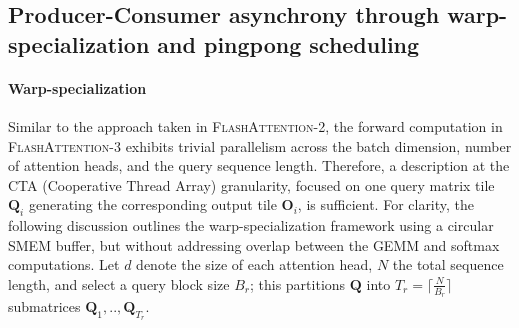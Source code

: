 \begin{enumerate}
\subsection{Producer-Consumer asynchrony through warp-specialization and pingpong scheduling}
\label{sec:algo_ws}

\paragraph{Warp-specialization}
Similar to the approach taken in \textsc{FlashAttention-2}, the forward computation in \textsc{FlashAttention-3} exhibits trivial parallelism across the batch dimension, number of attention heads, and the query sequence length. Therefore, a description at the CTA (Cooperative Thread Array) granularity, focused on one query matrix tile $\mathbf{Q}_i$ generating the corresponding output tile $\mathbf{O}_i$, is sufficient. For clarity, the following discussion outlines the warp-specialization framework using a circular SMEM buffer, but without addressing overlap between the GEMM and softmax computations. Let $d$ denote the size of each attention head, $N$ the total sequence length, and select a query block size $B_r$; this partitions $\mathbf{Q}$ into $T_r = \lceil \frac{N}{B_r} \rceil$ submatrices $\mathbf{Q}_1, .., \mathbf{Q}_{T_r}$.


\end{enumerate}
